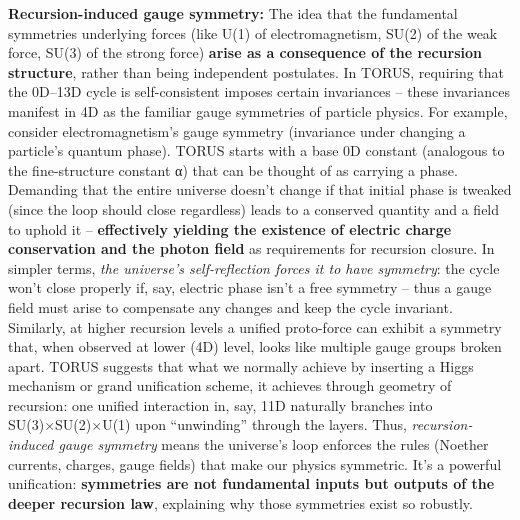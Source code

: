 \documentclass[
]{article}
\begin{document}
\textbf{Recursion-induced gauge symmetry:} The idea that the fundamental
symmetries underlying forces (like U(1) of electromagnetism, SU(2) of
the weak force, SU(3) of the strong force) \textbf{arise as a
consequence of the recursion structure}, rather than being independent
postulates. In TORUS, requiring that the 0D--13D cycle is
self-consistent imposes certain invariances -- these invariances
manifest in 4D as the familiar gauge symmetries of particle
physics\hspace{0pt}. For example, consider electromagnetism's gauge
symmetry (invariance under changing a particle's quantum phase). TORUS
starts with a base 0D constant (analogous to the fine-structure constant
α) that can be thought of as carrying a phase. Demanding that the entire
universe doesn't change if that initial phase is tweaked (since the loop
should close regardless) leads to a conserved quantity and a field to
uphold it -- \textbf{effectively yielding the existence of electric
charge conservation and the photon field} as requirements for recursion
closure\hspace{0pt}. In simpler terms, \emph{the universe's
self-reflection forces it to have symmetry}: the cycle won't close
properly if, say, electric phase isn't a free symmetry -- thus a gauge
field must arise to compensate any changes and keep the cycle invariant.
Similarly, at higher recursion levels a unified proto-force can exhibit
a symmetry that, when observed at lower (4D) level, looks like multiple
gauge groups broken apart\hspace{0pt}. TORUS suggests that what we
normally achieve by inserting a Higgs mechanism or grand unification
scheme, it achieves through geometry of recursion: one unified
interaction in, say, 11D naturally branches into SU(3)×SU(2)×U(1) upon
``unwinding'' through the layers\hspace{0pt}. Thus,
\emph{recursion-induced gauge symmetry} means the universe's loop
enforces the rules (Noether currents, charges, gauge fields) that make
our physics symmetric. It's a powerful unification: \textbf{symmetries
are not fundamental inputs but outputs of the deeper recursion law},
explaining why those symmetries exist so robustly.
\end{document}
